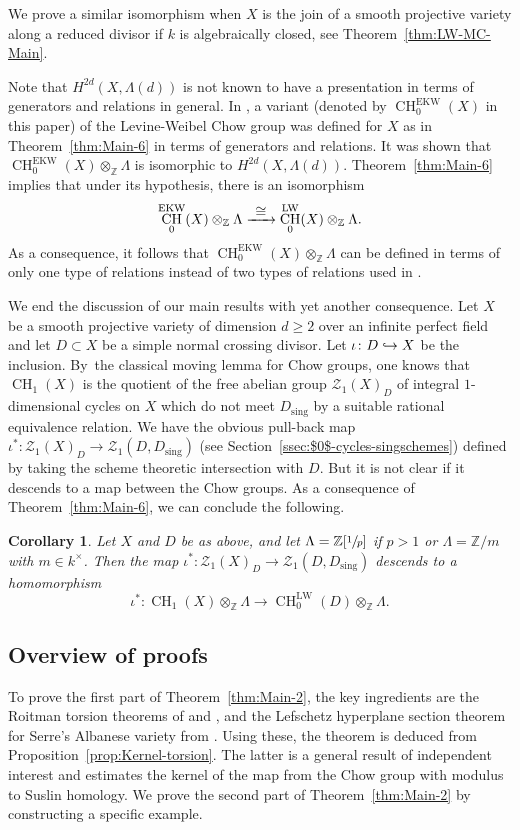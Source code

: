 \documentclass[JEP,XML,SOM,Unicode,published]{cedram}
\let\mathcal\mathscr
\def\hto{\mathrel{\lhook\joinrel\to}}
\def\To#1{\mathchoice{\xrightarrow{\textstyle\kern4pt#1\kern3pt}}{\stackrel{#1}{\longrightarrow}}{}{}}
\let\inj\hto
\newcommand{\EKW}{\mathrm{EKW}}
\newcommand{\LW}{\mathrm{LW}}
\newtheorem{cor}[thm]{Corollary}
\theoremstyle{definition}
\newcommand{\thmref}{Theorem~\ref}
\newcommand{\propref}{Proposition~\ref}
\newcommand{\secref}{Section~\ref}
\newcommand{\sZ}{{\mathcal Z}}
\newcommand{\Z}{{\mathbb Z}}
\DeclareMathOperator{\CH}{CH}
\newcommand{\sing}{\mathrm{sing}}
\begin{document}
We prove a similar isomorphism when $X$ is the join of a smooth
projective variety along a reduced divisor if $k$ is algebraically closed,
see \thmref{thm:LW-MC-Main}.

Note that $H^{2d}(X, \Lambda(d))$ is not known to have a presentation in terms
of generators and relations in general. In \cite[Th.\,7.1]{EKW},
a variant (denoted by $\CH^{\EKW}_0(X)$ in this paper)
of the Levine-Weibel Chow group
was defined for $X$ as in \thmref{thm:Main-6}
in terms of generators and relations. It was shown that
$\CH^{\EKW}_0(X) \otimes_{\Z} \Lambda$ is isomorphic to $H^{2d}(X, \Lambda(d))$.
\thmref{thm:Main-6} implies that under its hypothesis, there is an isomorphism
\[
\CH^{\EKW}_0(X) \otimes_{\Z} \Lambda \To{\cong} \CH^{\LW}_0(X) \otimes_{\Z} \Lambda.
\]
As a consequence, it follows that $\CH^{\EKW}_0(X) \otimes_{\Z} \Lambda$
can be defined in terms
of only one type of relations instead of two types of relations used in
\cite{EKW}.

We end the discussion of our main results with yet another consequence.
Let $X$ be a smooth projective variety of dimension $d \ge 2$
over an infinite
perfect field and let $D \subset X$ be a simple normal crossing divisor.
Let $\iota \colon D \inj X$ be the inclusion.
By~the classical moving lemma for Chow groups, one knows that $\CH_1(X)$
is the quotient of the free abelian group $\sZ_1(X)_D$ of integral
$1$-dimensional cycles on $X$ which do not meet $D_\sing$ by a suitable
rational equivalence relation. We have the obvious pull-back map
$\iota^* \colon \sZ_1(X)_D \to \sZ_1(D, D_\sing)$
(see \secref{ssec:$0$-cycles-singschemes}) defined by taking the
scheme theoretic intersection with $D$. But it is not clear if
it descends to a map between the Chow groups.
As a consequence of \thmref{thm:Main-6}, we can conclude the following.

\begin{cor}\label{cor:Main-8}Let $X$ and $D$ be as above, and let $\Lambda = \Z[\sfrac{1}{p}]$ if $p>1$ or $\Lambda = {\Z}/m$ with $m \in k^{\times}$. Then
the map $\iota^* \colon \sZ_1(X)_D \to \sZ_1(D, D_\sing)$ descends to a
homomorphism
\[
\iota^* \colon \CH_1(X) \otimes_{\Z} \Lambda \to \CH^{\LW}_0(D)\otimes_{\Z} \Lambda.
\]
\end{cor}

\subsection{Overview of proofs}\label{sec:proofs}
To prove the first part of \thmref{thm:Main-2}, the key ingredients are the Roitman
torsion theorems of \cite{Krishna-2} and \cite{SS}, and the Lefschetz hyperplane
section theorem for Serre's Albanese variety from \cite{GK-1}.
Using these, the theorem is deduced from \propref{prop:Kernel-torsion}.
The latter is a general result of independent interest and estimates the kernel
of the map from the Chow group with modulus to Suslin homology.
We prove the second part of \thmref{thm:Main-2} by constructing a specific example.
\end{document}
